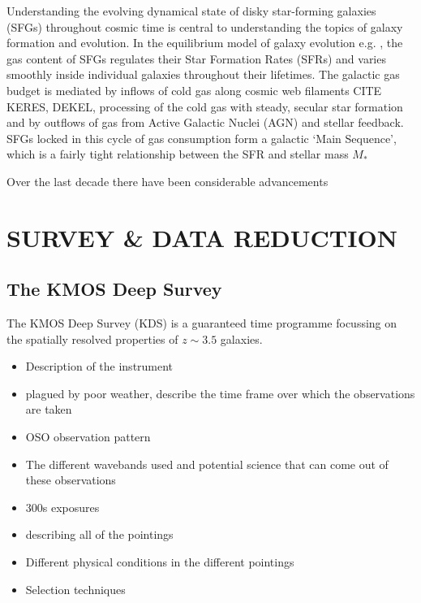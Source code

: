\documentclass[a4paper,fleqn,usenatbib]{mn2e}
\begin{document}
Understanding the evolving dynamical state of disky star-forming galaxies (SFGs) throughout cosmic time is central to understanding the topics of galaxy formation and evolution.
In the equilibrium model of galaxy evolution e.g. \cite{Genel2008,Lilly2013,Bouche2010,Dave2011,Dave2011a,Dave2011b,Krumholz2012}, the gas content of SFGs regulates their Star Formation Rates (SFRs) and varies smoothly inside individual galaxies throughout their lifetimes.
The galactic gas budget is mediated by inflows of cold gas along cosmic web filaments CITE KERES, DEKEL, processing of the cold gas with steady, secular star formation and by outflows of gas from Active Galactic Nuclei (AGN) and stellar feedback.
SFGs locked in this cycle of gas consumption form a galactic `Main Sequence', which is a fairly tight relationship between the SFR and stellar mass $M_{*}$  

Over the last decade there have been considerable advancements 

\citep{Wisnioski2015} \citep{ForsterSchreiber2009} \citep{ForsterSchreiber2006} \citep{Stott2016} \citep{Gnerucci2011} \citep{Epinat2012} \citep{Epinat2009} \citep{Epinat2010} \citep{Lilly2013} \citep{Saintonge2013} \citep{Wisnioski2011} \citep{Wright2007} \citep{Wright2009} \citep{Genzel2008} \citep{Genzel2006} \citep{Shapiro2008} \citep{Jones2010a} \citep{Newman2013} \citep{Genel2008} \citep{Nesvadba2008} \citep{Queyrel2012} \citep{Law2007} \citep{Law2009}
\citep{Simons2016} \citep{Pelliccia2016} \citep{Genzel2011} \citep{Epinat2008} \citep{Epinat2008a} \citep{Puech2008} \citep{Puech2007} \cite{Holmberg1958} \citep{Kassin2012} \citep{Flores2006} \citep{Neichel2008} \citep{Miller2011} \citep{Nesvadba2006} \citep{Nesvadba2007} \citep{Livermore2015} \citep{Swinbank2006} \citep{Swinbank2007} \citep{Swinbank2009} \citep{Cortese2014}

\section{SURVEY \& DATA REDUCTION}

\subsection{The KMOS Deep Survey}
The KMOS Deep Survey (KDS) is a guaranteed time programme focussing on the spatially resolved properties of $z \sim 3.5$ galaxies.

\begin{itemize}
    \item Description of the instrument 
    \item plagued by poor weather, describe the time frame over which the observations are taken
    \item OSO observation pattern
    \item The different wavebands used and potential science that can come out of these observations
    \item 300s exposures
    \item describing all of the pointings 
    \item Different physical conditions in the different pointings
    \item Selection techniques 
\end{itemize}
\end{document}
